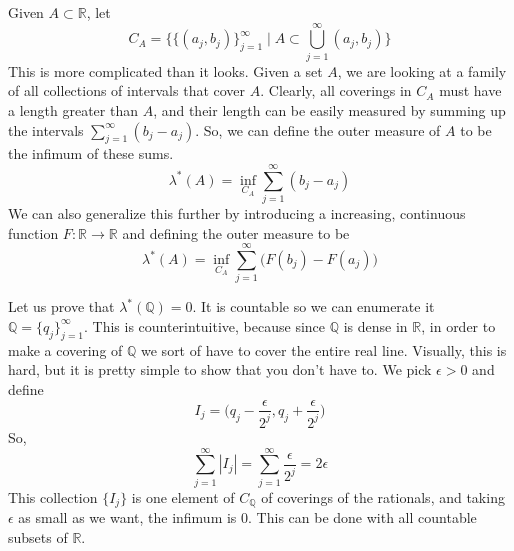   \begin{definition}
    Given $A \subset \mathbb{R}$, let 
    \begin{equation}
      C_A = \big\{ \{(a_j, b_j)\}_{j=1}^\infty \mid A \subset \bigcup_{j=1}^\infty (a_j, b_j) \big\}
    \end{equation}
    This is more complicated than it looks. Given a set $A$, we are looking at a family of all collections of intervals that cover $A$. Clearly, all coverings in $C_A$ must have a length greater than $A$, and their length can be easily measured by summing up the intervals $\sum_{j=1}^\infty (b_j - a_j)$. So, we can define the outer measure of $A$ to be the infimum of these sums. 
    \begin{equation}
      \lambda^*(A) = \inf_{C_A} \sum_{j=1}^\infty (b_j - a_j)
    \end{equation}
    We can also generalize this further by introducing a increasing, continuous function $F: \mathbb{R} \rightarrow \mathbb{R}$ and defining the outer measure to be 
    \begin{equation}
     \lambda^*(A) = \inf_{C_A} \sum_{j=1}^\infty \big( F(b_j) - F(a_j) \big) 
    \end{equation}
  \end{definition}

  \begin{example}
    Let us prove that $\lambda^*(\mathbb{Q}) = 0$. It is countable so we can enumerate it $\mathbb{Q} = \{ q_j\}_{j=1}^\infty$. This is counterintuitive, because since $\mathbb{Q}$ is dense in $\mathbb{R}$, in order to make a covering of $\mathbb{Q}$ we sort of have to cover the entire real line. Visually, this is hard, but it is pretty simple to show that you don't have to. We pick $\epsilon > 0$ and define 
    \begin{equation}
      I_j = \big( q_j - \frac{\epsilon}{2^j} , q_j + \frac{\epsilon}{2^j} \big)
    \end{equation}
    So, 
    \begin{equation}
      \sum_{j=1}^\infty |I_j| = \sum_{j=1}^\infty \frac{\epsilon}{2^j} = 2 \epsilon
    \end{equation}
    This collection $\{I_j\}$ is one element of $C_\mathbb{Q}$ of coverings of the rationals, and taking $\epsilon$ as small as we want, the infimum is $0$. This can be done with all countable subsets of $\mathbb{R}$. 
  \end{example}

